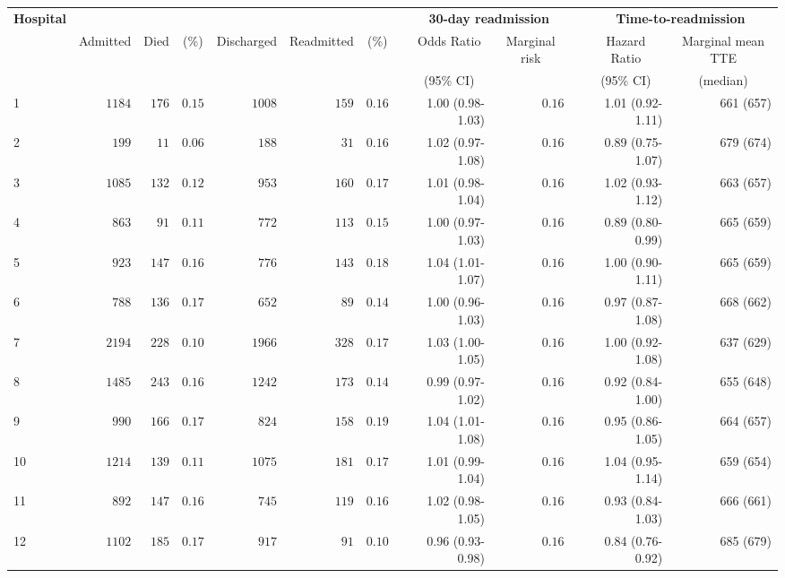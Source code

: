 \documentclass[]{article}\usepackage[]{graphicx}\usepackage[]{color}
\begin{document}
\begin{landscape}
\begin{table}[!tbp]
\end{table}
\begin{table}[!tbp]
\begin{center}
\begin{tabular}{lrrrrrrcrrcrr}
\hline\hline
\multicolumn{1}{l}{\bfseries Hospital}&\multicolumn{6}{c}{\bfseries }&\multicolumn{1}{c}{\bfseries }&\multicolumn{2}{c}{\bfseries 30-day readmission}&\multicolumn{1}{c}{\bfseries }&\multicolumn{2}{c}{\bfseries Time-to-readmission}\tabularnewline
\cline{9-10} \cline{12-13}
\multicolumn{1}{l}{}&\multicolumn{1}{c}{Admitted}&\multicolumn{1}{c}{Died}&\multicolumn{1}{c}{(\%)}&\multicolumn{1}{c}{Discharged}&\multicolumn{1}{c}{Readmitted}&\multicolumn{1}{c}{(\%)}&\multicolumn{1}{c}{}&\multicolumn{1}{c}{Odds Ratio}&\multicolumn{1}{c}{Marginal risk}&\multicolumn{1}{c}{}&\multicolumn{1}{c}{Hazard Ratio}&\multicolumn{1}{c}{Marginal mean TTE}\tabularnewline
&&&&&&&&\multicolumn{1}{c}{{\scriptsize (95\% CI)}}&&&\multicolumn{1}{c}{{\scriptsize (95\% CI)}}&\multicolumn{1}{c}{{\scriptsize (median)}}\tabularnewline
\hline
1&$1184$&$176$&$0.15$&$1008$&$159$&$0.16$&&1.00 (0.98-1.03)&$0.16$&&1.01 (0.92-1.11)&661 (657)\tabularnewline
2&$ 199$&$ 11$&$0.06$&$ 188$&$ 31$&$0.16$&&1.02 (0.97-1.08)&$0.16$&&0.89 (0.75-1.07)&679 (674)\tabularnewline
3&$1085$&$132$&$0.12$&$ 953$&$160$&$0.17$&&1.01 (0.98-1.04)&$0.16$&&1.02 (0.93-1.12)&663 (657)\tabularnewline
4&$ 863$&$ 91$&$0.11$&$ 772$&$113$&$0.15$&&1.00 (0.97-1.03)&$0.16$&&0.89 (0.80-0.99)&665 (659)\tabularnewline
5&$ 923$&$147$&$0.16$&$ 776$&$143$&$0.18$&&1.04 (1.01-1.07)&$0.16$&&1.00 (0.90-1.11)&665 (659)\tabularnewline
6&$ 788$&$136$&$0.17$&$ 652$&$ 89$&$0.14$&&1.00 (0.96-1.03)&$0.16$&&0.97 (0.87-1.08)&668 (662)\tabularnewline
7&$2194$&$228$&$0.10$&$1966$&$328$&$0.17$&&1.03 (1.00-1.05)&$0.16$&&1.00 (0.92-1.08)&637 (629)\tabularnewline
8&$1485$&$243$&$0.16$&$1242$&$173$&$0.14$&&0.99 (0.97-1.02)&$0.16$&&0.92 (0.84-1.00)&655 (648)\tabularnewline
9&$ 990$&$166$&$0.17$&$ 824$&$158$&$0.19$&&1.04 (1.01-1.08)&$0.16$&&0.95 (0.86-1.05)&664 (657)\tabularnewline
10&$1214$&$139$&$0.11$&$1075$&$181$&$0.17$&&1.01 (0.99-1.04)&$0.16$&&1.04 (0.95-1.14)&659 (654)\tabularnewline
11&$ 892$&$147$&$0.16$&$ 745$&$119$&$0.16$&&1.02 (0.98-1.05)&$0.16$&&0.93 (0.84-1.03)&666 (661)\tabularnewline
12&$1102$&$185$&$0.17$&$ 917$&$ 91$&$0.10$&&0.96 (0.93-0.98)&$0.16$&&0.84 (0.76-0.92)&685 (679)\tabularnewline

\end{tabular}
\end{center}
\end{table}
\end{landscape}
\end{document}
